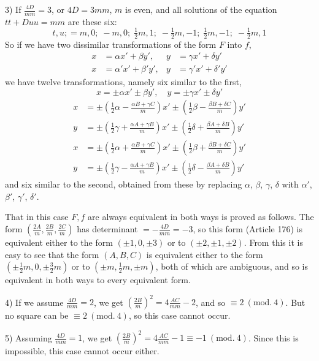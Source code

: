 3) If $\frac{4D}{mm}=3$, or $4D=3mm$, $m$ is even, and all solutions of the equation $tt+Duu=mm$ are these six:
\[
t,u;=m,0;\;-m,0;\;\tfrac12m,1;\;-\tfrac12m,-1;\;\tfrac12m,-1;\;-\tfrac12m,1
\]
So if we have two dissimilar transformations of the form $F$ into $f$,
\[
\begin{aligned}
x&=\alpha x'+\beta y',& y&=\gamma x'+\delta y'\\
x&=\alpha'x'+\beta'y',& y&=\gamma'x'+\delta'y'
\end{aligned}
\]
we have twelve transformations, namely six similar to the first,
\[
x=\pm\alpha x'\pm\beta y',\quad y=\pm\gamma x'\pm\delta y'
\]
\[
\begin{aligned}
x&=\pm(\tfrac12\alpha-\tfrac{\alpha B+\gamma C}{m})x'\pm(\tfrac12\beta-\tfrac{\beta B+\delta C}{m})y'\\
y&=\pm(\tfrac12\gamma+\tfrac{\alpha A+\gamma B}{m})x'\pm(\tfrac12\delta+\tfrac{\beta A+\delta B}{m})y'
\end{aligned}
\]
\[
\begin{aligned}
x&=\pm(\tfrac12\alpha+\tfrac{\alpha B+\gamma C}{m})x'\pm(\tfrac12\beta+\tfrac{\beta B+\delta C}{m})y'\\
y&=\pm(\tfrac12\gamma-\tfrac{\alpha A+\gamma B}{m})x'\pm(\tfrac12\delta-\tfrac{\beta A+\delta B}{m})y'
\end{aligned}
\]
and six similar to the second, obtained from these by replacing $\alpha$, $\beta$, $\gamma$, $\delta$ with $\alpha'$, $\beta'$, $\gamma'$, $\delta'$.

That in this case $F,f$ are always equivalent in both ways is proved as follows. The form $(\frac{2A}{m},\frac{2B}{m},\frac{2C}{m})$ has determinant $=-\frac{4D}{mm}=-3$, so this form (Article 176) is equivalent either to the form $(\pm1,0,\pm3)$ or to $(\pm2,\pm1,\pm2)$. From this it is easy to see that the form $(A,B,C)$ is equivalent either to the form $(\pm\tfrac12m,0,\pm\tfrac32m)$ or to $(\pm m,\tfrac12m,\pm m)$, both of which are ambiguous, and so is equivalent in both ways to every equivalent form.

4) If we assume $\frac{4D}{mm}=2$, we get $(\frac{2B}{m})^2=4\frac{AC}{mm}-2$, and so $\equiv2\ (\mathrm{mod.}\ 4)$.
But no square can be $\equiv2\ (\mathrm{mod.}\ 4)$, so this case cannot occur.

5) Assuming $\frac{4D}{mm}=1$, we get $(\frac{2B}{m})^2=4\frac{AC}{mm}-1\equiv-1\ (\mathrm{mod.}\ 4)$. Since this is impossible, this case cannot occur either.

